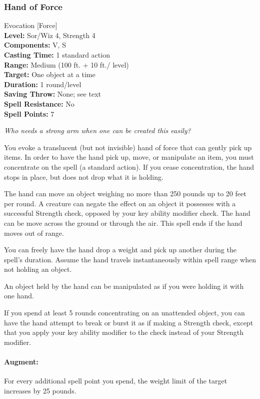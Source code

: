 \subsubsection{Hand of Force}
\label{Spell:HandOfForce}
Evocation [Force]
\\ \textbf{Level:} Sor/Wiz 4, Strength 4
\\ \textbf{Components:} V, S
\\ \textbf{Casting Time:} 1 standard action
\\ \textbf{Range:} Medium (100 ft. + 10 ft./ level)
\\ \textbf{Target:} One object at a time
\\ \textbf{Duration:} 1 round/level
\\ \textbf{Saving Throw:} None; see text
\\ \textbf{Spell Resistance:} No
\\ \textbf{Spell Points:} 7

\emph{Who needs a strong arm when one can be created this easily?}

You evoke a translucent (but not invisible) hand of force that can gently pick up items.
In order to have the hand pick up, move, or manipulate an item, you must concentrate on the spell (a standard action).
If you cease concentration, the hand stops in place, but does not drop what it is holding.

The hand can move an object weighing no more than 250 pounds up to 20 feet per round. 
A creature can negate the effect on an object it possesses with a successful Strength check, opposed by your key ability modifier check. 
The hand can be move across the ground or through the air. 
This spell ends if the hand moves out of range. 

You can freely have the hand drop a weight and pick up another during the spell's duration.
Assume the hand travels instantaneously within spell range when not holding an object.

An object held by the hand can be manipulated as if you were holding it with one hand.

If you spend at least 5 rounds concentrating on an unattended object, 
you can have the hand attempt to break or burst it as if making a Strength check, 
except that you apply your key ability modifier to the check instead of your Strength modifier.

\paragraph{Augment:}
For every additional spell point you spend, the weight limit of the target increases by 25 pounds.
